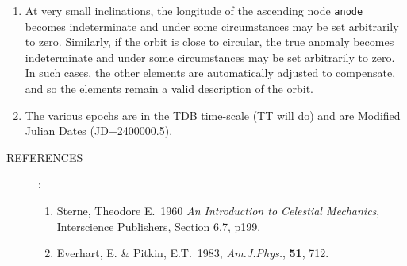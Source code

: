\documentclass[11pt,fleqn,twoside]{article}
\renewcommand{\_}{{\tt\char'137}}     %
\newlength{\oldspacing}
\newcommand{\refs}[1]
{
  \goodbreak
  \setlength{\oldspacing}{\topsep}
  \setlength{\topsep}{0.3ex}
  \begin{description}
    \item[REFERENCES]:
        #1
  \end{description}
  \setlength{\topsep}{\oldspacing}
}
\begin{document}
{\begin{enumerate}
        where:
        \begin{tabbing}
        xxx \= xxxxxxxx \= xxx \= \kill
        \> $t_0$    \> is the epoch of the elements (MJD, TT) \\
        \> $T$      \> is the epoch of perihelion (MJD, TT) \\
        \> $i$      \> is the inclination (radians) \\
        \> $\Omega$ \> is the longitude of the ascending node (radians) \\
        \> $\varpi$ \> is the longitude of perihelion (radians) \\
        \> $\omega$ \> is the argument of perihelion (radians) \\
        \> $a$      \> is the mean distance (AU) \\
        \> $q$      \> is the perihelion distance (AU) \\
        \> $e$      \> is the eccentricity \\
        \> $L$      \> is the longitude (radians, $0-2\pi$) \\
        \> $M$      \> is the mean anomaly (radians, $0-2\pi$) \\
        \> $n$      \> is the daily motion (radians) \\
        \> - \> means no value is set
        \end{tabbing}
  \item At very small inclinations, the longitude of the ascending node
        {\tt anode} becomes indeterminate
        and under some circumstances may be
        set arbitrarily to zero.  Similarly, if the orbit is close to
        circular, the true anomaly becomes indeterminate and under some
        circumstances may be set arbitrarily to zero.  In such cases,
        the other elements are automatically adjusted to compensate,
        and so the elements remain a valid description of the orbit.
  \item The various epochs are in the TDB time-scale (TT will do) and are
        Modified Julian Dates (JD$-$2400000.5).
 \end{enumerate}
}
\refs{
   \begin{enumerate}
   \item Sterne, Theodore E.\ 1960
         {\it An Introduction to Celestial Mechanics},
         Interscience Publishers, Section 6.7, p199.
   \item Everhart, E. \& Pitkin, E.T.\ 1983, {\it Am.J.Phys.},
         {\bf 51}, 712.
   \end{enumerate}
}
\end{document}
